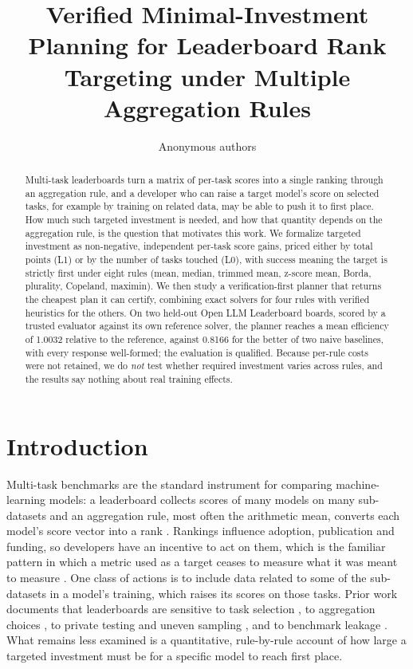 \documentclass{article}
\title{Verified Minimal-Investment Planning for Leaderboard Rank Targeting under Multiple Aggregation Rules}
\author{Anonymous authors}
\begin{document}
\maketitle

\begin{abstract}
Multi-task leaderboards turn a matrix of per-task scores into a single ranking through an aggregation rule, and a developer who can raise a target model's score on selected tasks, for example by training on related data, may be able to push it to first place. How much such targeted investment is needed, and how that quantity depends on the aggregation rule, is the question that motivates this work. We formalize targeted investment as non-negative, independent per-task score gains, priced either by total points (L1) or by the number of tasks touched (L0), with success meaning the target is strictly first under eight rules (mean, median, trimmed mean, z-score mean, Borda, plurality, Copeland, maximin). We then study a verification-first planner that returns the cheapest plan it can certify, combining exact solvers for four rules with verified heuristics for the others. On two held-out Open LLM Leaderboard boards, scored by a trusted evaluator against its own reference solver, the planner reaches a mean efficiency of 1.0032 relative to the reference, against 0.8166 for the better of two naive baselines, with every response well-formed; the evaluation is qualified. Because per-rule costs were not retained, we do \emph{not} test whether required investment varies across rules, and the results say nothing about real training effects.
\end{abstract}

\section{Introduction}
Multi-task benchmarks are the standard instrument for comparing machine-learning models: a leaderboard collects scores of many models on many sub-datasets and an aggregation rule, most often the arithmetic mean, converts each model's score vector into a rank \citep{Hendrycks2020MeasuringMM,Liang2022HolisticEO}. Rankings influence adoption, publication and funding, so developers have an incentive to act on them, which is the familiar pattern in which a metric used as a target ceases to measure what it was meant to measure \citep{Thomas2020RelianceOM}. One class of actions is to include data related to some of the sub-datasets in a model's training, which raises its scores on those tasks. Prior work documents that leaderboards are sensitive to task selection \citep{Dehghani2021TheBL}, to aggregation choices \citep{Colombo2022WhatAT,Rofin2022VotenRankRO,Lanctot2023EvaluatingAU}, to private testing and uneven sampling \citep{Singh2025TheLI}, and to benchmark leakage \citep{Zhou2023DontMY,Sainz2023NLPEI,Yang2023RethinkingBA}. What remains less examined is a quantitative, rule-by-rule account of how large a targeted investment must be for a specific model to reach first place.
\end{document}
